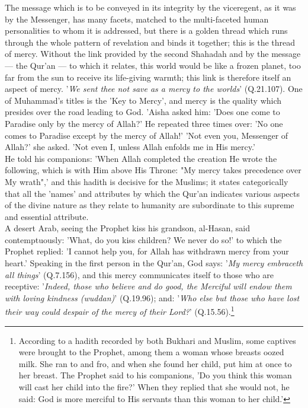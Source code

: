 \documentclass[11pt, b5paper, twoside]{book}
\begin{document}
The message which is to be conveyed in its integrity by the viceregent, as it was by the Messenger, 
has many facets, matched to the multi-faceted human personalities to whom it is addressed, but there 
is a golden thread which runs through the whole pattern of revelation and binds it together; this is 
the thread of mercy. Without the link provided by the second Shahadah and by the message --- the Qur'an 
--- to which it relates, this world would be like a frozen planet, too far from the sun to receive its 
life-giving warmth; this link is therefore itself an aspect of mercy. '\emph{We sent thee not save as a 
mercy to the worlds}' (Q.21.107). One of Muhammad's titles is the 'Key to Mercy', and mercy is the 
quality which presides over the road leading to God. 'Aisha asked him: 'Does one come to Paradise 
only by the mercy of Allah?' He repeated three times over: 'No one comes to Paradise except by the 
mercy of Allah!' 'Not even you, Messenger of Allah?' she asked. 'Not even I, unless Allah enfolds me 
in His mercy.' \\

He told his companions: 'When Allah completed the creation He wrote the following, which is with Him 
above His Throne: "My mercy takes precedence over My wrath",' and this hadith is decisive for the 
Muslims; it states categorically that all the 'names' and attributes by which the Qur'an indicates 
various aspects of the divine nature as they relate to humanity are subordinate to this supreme and 
essential attribute. \\

A desert Arab, seeing the Prophet kiss his grandson, al-Hasan, said contemptuously: 'What, do you 
kiss children? We never do so!' to which the Prophet replied: 'I cannot help you, for Allah has 
withdrawn mercy from your heart.' Speaking in the first person in the Qur'an, God says: '\emph{My mercy 
embraceth all things}' (Q.7.156), and this mercy communicates itself to those who are receptive: 
'\emph{Indeed, those who believe and do good, the Merciful will endow them with loving kindness (wuddan)}' (Q.19.96); and: '\emph{Who else but those who have lost their way could despair of the mercy of their Lord?}' (Q.15.56).\footnote{According to a hadith recorded by both Bukhari and Muslim, some captives were brought to the Prophet, among them a woman whose breasts oozed milk. She ran to and fro, and when she found her child, put him at once to her breast. The Prophet said to his companions, 'Do you think this woman will cast her child into the fire?' When they replied that she would not, he said: God is more merciful to His servants than this woman to her child.'}
\end{document}
